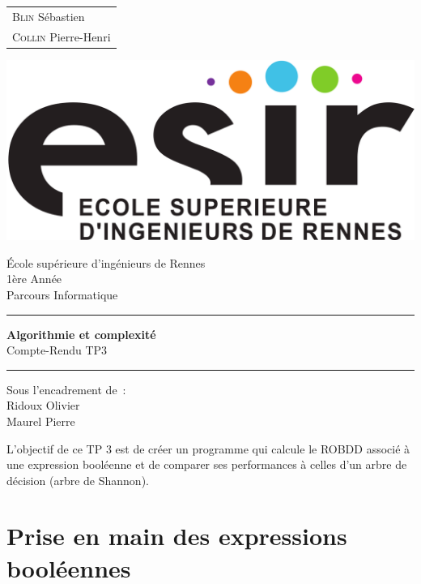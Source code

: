 \documentclass{article}
\begin{document}
\begin{titlepage}
	\vspace{-20px}
	\begin{tabular}{l}
		\textsc{Blin} S\'ebastien\\
		\textsc{Collin} Pierre-Henri
	\end{tabular}
	\hfill \vspace{10px}\includegraphics[scale=0.1]{esir.png}\\
	\vfill
	\begin{center}
		\Huge{\'Ecole sup\'erieure d'ing\'enieurs de Rennes}\\
		\vspace{1cm}
		\LARGE{1\`ere Ann\'ee}\\
		\large{Parcours Informatique}\\
		\vspace{0.5cm}\hrule\vspace{0.5cm}
		\LARGE{\textbf{Algorithmie et complexité}}\\
		\Large{Compte-Rendu TP3}
		\vspace{0.5cm}\hrule
		\vfill
		\vfill
	\end{center}
	\begin{flushleft}
		\Large{Sous l'encadrement de~:}\\
		\vspace{0.2cm}
		\large{{Ridoux} Olivier}\\
		\large{{Maurel} Pierre}
	\end{flushleft}
	\vfill
\end{titlepage}

L'objectif de ce TP 3 est de créer un programme qui calcule le ROBDD associé à une expression booléenne et de comparer ses performances à celles d'un arbre de décision (arbre de Shannon).
\section{Prise en main des expressions booléennes}
\end{document}

